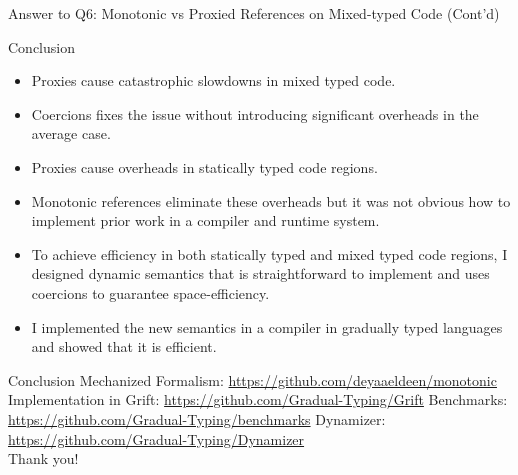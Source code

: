 \documentclass[12pt,dvipsnames]{beamer}
\begin{document}
\begin{frame}{Answer to Q6: Monotonic vs Proxied References on Mixed-typed Code (Cont'd)}
  \begin{center}
  \end{center}
\end{frame}

\begin{frame}{Conclusion}
  \begin{itemize}
  \item Proxies cause catastrophic slowdowns in mixed typed code.
  \item Coercions fixes the issue without introducing significant
    overheads in the average case.
  \item Proxies cause overheads in statically typed code regions.
  \item Monotonic references eliminate these overheads but it was not
    obvious how to implement prior work in a compiler and runtime
    system.
  \item To achieve efficiency in both statically typed and mixed typed
    code regions, I designed dynamic semantics that is straightforward
    to implement and uses coercions to guarantee space-efficiency.
  \item I implemented the new semantics in a compiler in gradually typed
    languages and showed that it is efficient.
  \end{itemize}
\end{frame}

\begin{frame}{Conclusion}
  \centering
  Mechanized Formalism: \url{https://github.com/deyaaeldeen/monotonic}
  Implementation in Grift: \url{https://github.com/Gradual-Typing/Grift}
  Benchmarks: \url{https://github.com/Gradual-Typing/benchmarks}
  Dynamizer: \url{https://github.com/Gradual-Typing/Dynamizer}
  \\
  \vspace{1cm}
  \centering
  \Huge Thank you!
\end{frame}
\end{document}
